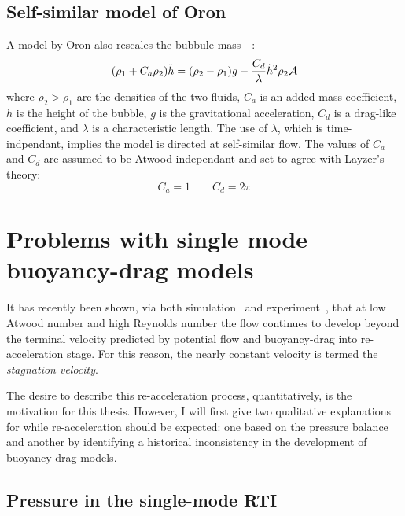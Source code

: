 \subsection{Self-similar model of Oron}

A model by Oron \etal also rescales the bubbule mass~~\cite{Oron2001}:
\begin{equation} \elabel{buoyancy_drag}
(\rho_1 + C_a \rho_2) \ddot{h} = (\rho_2 - \rho_1)g - \frac{C_d}{\lambda} \dot{h}^2 \rho_2 \mathcal{A}
\end{equation}
where $\rho_2 > \rho_1$ are the densities of the two fluids, 
$C_a$ is an added mass coefficient,
$h$ is the height of the bubble,
$g$ is the gravitational acceleration,
$C_d$ is a drag-like coefficient, and
$\lambda$ is a characteristic length.
The use of $\lambda$, which is time-indpendant, implies the model is directed at self-similar flow.
The values of $C_a$ and $C_d$ are assumed to be Atwood independant and set to agree with Layzer's theory:
\begin{equation}
C_a = 1 \qquad C_d = 2\pi
\end{equation}

\section{Problems with single mode buoyancy-drag models}

It has recently been shown, via both simulation~\cite{Ramaprabhu2006} and experiment~\cite{Wilkinson2007}, that at low Atwood number and high Reynolds number the flow continues to develop beyond the terminal velocity predicted by potential flow and buoyancy-drag into re-acceleration stage.
For this reason, the nearly constant velocity is termed the \textit{stagnation velocity}.

The desire to describe this re-acceleration process, quantitatively, is the motivation for this thesis.
However, I will first give two qualitative explanations for while re-acceleration should be expected: one based on the pressure balance and another by identifying a historical inconsistency in the development of buoyancy-drag models.

\subsection{Pressure in the single-mode RTI}

